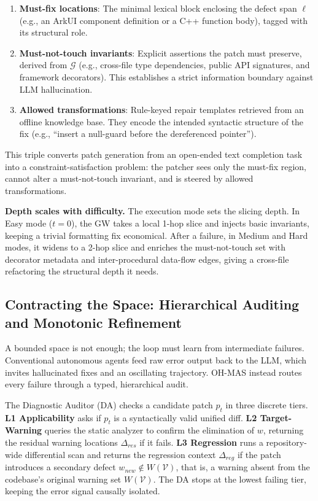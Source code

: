 \documentclass[10pt,conference]{IEEEtran}
\begin{document}
\begin{enumerate}[label=\textbf{(M\arabic*)}, leftmargin=*, topsep=2pt, itemsep=4pt]
\item \textbf{Must-fix locations}: The minimal lexical block enclosing the defect span $\ell$ (e.g., an ArkUI component definition or a C++ function body), tagged with its structural role.
\item \textbf{Must-not-touch invariants}: Explicit assertions the patch must preserve, derived from $\mathcal{G}$ (e.g., cross-file type dependencies, public API signatures, and framework decorators). This establishes a strict information boundary against LLM hallucination.
\item \textbf{Allowed transformations}: Rule-keyed repair templates retrieved from an offline knowledge base. They encode the intended syntactic structure of the fix (e.g., ``insert a null-guard before the dereferenced pointer'').
\end{enumerate}

This triple converts patch generation from an open-ended text completion task into a constraint-satisfaction problem: the patcher sees only the must-fix region, cannot alter a must-not-touch invariant, and is steered by allowed transformations. 

\textbf{Depth scales with difficulty.} The execution mode sets the slicing depth. In Easy mode ($t{=}0$), the GW takes a local 1-hop slice and injects basic invariants, keeping a trivial formatting fix economical. After a failure, in Medium and Hard modes, it widens to a 2-hop slice and enriches the must-not-touch set with decorator metadata and inter-procedural data-flow edges, giving a cross-file refactoring the structural depth it needs.

\subsection{Contracting the Space: Hierarchical Auditing and Monotonic Refinement}
\label{sec:app_refinement}

A bounded space is not enough; the loop must learn from intermediate failures. Conventional autonomous agents feed raw error output back to the LLM, which invites hallucinated fixes and an oscillating trajectory. OH-MAS instead routes every failure through a typed, hierarchical audit.

The Diagnostic Auditor (DA) checks a candidate patch $p_t$ in three discrete tiers. \textbf{L1 Applicability} asks if $p_t$ is a syntactically valid unified diff. \textbf{L2 Target-Warning} queries the static analyzer to confirm the elimination of $w$, returning the residual warning locations $\Delta_{res}$ if it fails. \textbf{L3 Regression} runs a repository-wide differential scan and returns the regression context $\Delta_{reg}$ if the patch introduces a secondary defect $w_{new}\notin W(\mathcal{V})$, that is, a warning absent from the codebase's original warning set $W(\mathcal{V})$. The DA stops at the lowest failing tier, keeping the error signal causally isolated.
\end{document}
